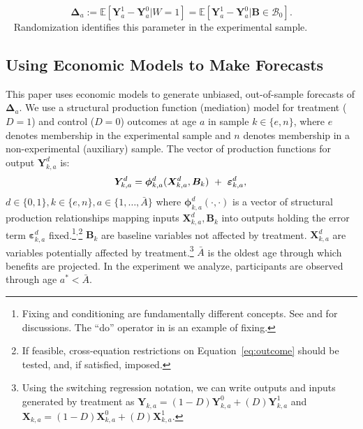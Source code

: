 \begin{equation}
\bm{\Delta}_a  := \mathbb{E} \left[ \bm{Y}^1_a - \bm{Y}^0_a | W = 1 \right] = \mathbb{E} \left[\bm{Y}^1_a - \bm{Y}^0_{a} | \bm{B} \in \mathcal{B}_0 \right]. \label{eq:mainte}
\end{equation}\
%
Randomization identifies this parameter in the experimental sample.

\subsection{Using Economic Models to Make Forecasts}

\noindent This paper uses economic models to generate unbiased, out-of-sample forecasts of $\bm{\Delta}_a$. We use a structural production function (mediation) model for treatment ($D=1$) and control ($D=0$) outcomes at age $a$ in sample $k \in \{e,n\}$, where $e$ denotes membership in the experimental sample and $n$ denotes membership in a non-experimental (auxiliary) sample. The vector of production functions for output $\bm{Y}^d_{k,a}$ is:
\begin{equation}
\bm{Y}^d_{k,a} = \bm{\phi}^d_{k,a} (\bm{X}^d_{k,a}, \bm{B}_k) \ + \ \bm{\varepsilon}^d_{k,a},  \label{eq:outcome} \\
\end{equation}
$d \in\{0,1\},  k\in\{e,n\}, a\in\{1,\dots,\bar{A}\}$ where $\bm{\phi}^d_{k,a}\left( \cdot, \cdot \right)$ is a vector of structural production relationships mapping inputs $\bm{X}^d_{k,a}, \bm{B}_k$ into outputs holding the error term $\bm{\varepsilon}^d_{k,a}$ fixed.\footnote{Fixing and conditioning are fundamentally different concepts. See \cite{Haavelmo_1943_Econometrica} and \citet{Heckman_Pinto_2015_EconometReviews} for discussions. The ``do'' operator in \citet{Pearl_2009_BOOKcausality} is an example of fixing.}$^{\text{,}}$\footnote{If feasible, cross-equation restrictions on Equation~\eqref{eq:outcome} should be tested, and, if satisfied, imposed.} $\bm{B}_k$ are baseline variables not affected by treatment. $\bm{X}^d_{k,a}$ are variables potentially affected by treatment.\footnote{Using the \citet{Quandt_1972_JASA} switching regression notation, we can write outputs and inputs generated by treatment as $\bm{Y}_{k,a} = \left( 1 - D \right) \bm{Y}^0_{k,a} +  \left( D \right) \bm{Y}^1_{k,a}$ and $\bm{X}_{k,a} = \left( 1 - D \right) \bm{X}^0_{k,a} +  \left( D \right) \bm{X}^1_{k,a}$.} $\bar{A}$ is the oldest age through which benefits are projected. In the experiment we analyze, participants are observed through age $a^*< \bar{A}$.

